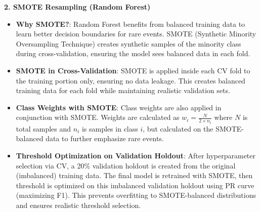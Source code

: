 \documentclass[12pt,a4paper]{article}
\begin{document}
\textbf{2. SMOTE Resampling (Random Forest)}
\begin{itemize}
    \item \textbf{Why SMOTE?}: Random Forest benefits from balanced training data to learn better decision boundaries for rare events. SMOTE (Synthetic Minority Oversampling Technique) creates synthetic samples of the minority class during cross-validation, ensuring the model sees balanced data in each fold.
    \item \textbf{SMOTE in Cross-Validation}: SMOTE is applied inside each CV fold to the training portion only, ensuring no data leakage. This creates balanced training data for each fold while maintaining realistic validation sets.
    \item \textbf{Class Weights with SMOTE}: Class weights are also applied in conjunction with SMOTE. Weights are calculated as $w_i = \frac{N}{2 \times n_i}$ where $N$ is total samples and $n_i$ is samples in class $i$, but calculated on the SMOTE-balanced data to further emphasize rare events.
    \item \textbf{Threshold Optimization on Validation Holdout}: After hyperparameter selection via CV, a 20\% validation holdout is created from the original (imbalanced) training data. The final model is retrained with SMOTE, then threshold is optimized on this imbalanced validation holdout using PR curve (maximizing F1). This prevents overfitting to SMOTE-balanced distributions and ensures realistic threshold selection.
\end{itemize}
\end{document}
